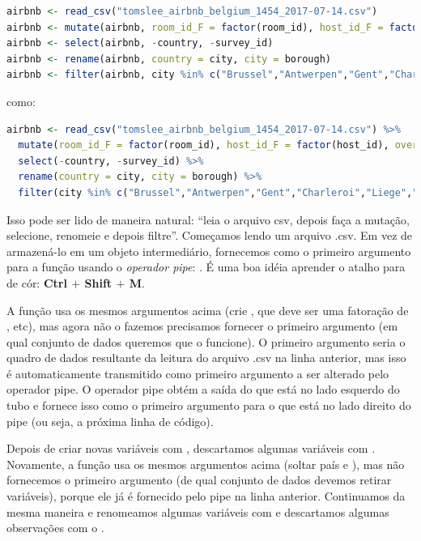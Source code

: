 \documentclass{article}
\begin{document}
\begin{lstlisting}[language=R]
airbnb <- read_csv("tomslee_airbnb_belgium_1454_2017-07-14.csv")
airbnb <- mutate(airbnb, room_id_F = factor(room_id), host_id_F = factor(host_id), overall_satisfaction_100 = overall_satisfaction * 20)
airbnb <- select(airbnb, -country, -survey_id)
airbnb <- rename(airbnb, country = city, city = borough)
airbnb <- filter(airbnb, city %in% c("Brussel","Antwerpen","Gent","Charleroi","Liege","Brugge","Namur","Leuven","Mons","Aalst")) 
\end{lstlisting}

como:
\begin{lstlisting}[language=R]
airbnb <- read_csv("tomslee_airbnb_belgium_1454_2017-07-14.csv") %>% 
  mutate(room_id_F = factor(room_id), host_id_F = factor(host_id), overall_satisfaction_100 = overall_satisfaction * 20) %>% 
  select(-country, -survey_id) %>% 
  rename(country = city, city = borough) %>% 
  filter(city %in% c("Brussel","Antwerpen","Gent","Charleroi","Liege","Brugge","Namur","Leuven","Mons","Aalst")) 
\end{lstlisting}

Isso pode ser lido de maneira natural: “leia o arquivo csv, depois faça a mutação, selecione, renomeie e depois filtre”. Começamos lendo um arquivo .csv. Em vez de armazená-lo em um objeto intermediário, fornecemos como o primeiro argumento para a função  usando o \textit{operador pipe}: \fbox{\%$>$\%}. É uma boa idéia aprender o atalho para \fbox{\%$>$\%} de cór: \textbf{Ctrl $+$ Shift $+$ M}. 

A função  usa os mesmos argumentos acima (crie , que deve ser uma fatoração de , etc), mas agora não o fazemos precisamos fornecer o primeiro argumento (em qual conjunto de dados queremos que o  funcione). O primeiro argumento seria o quadro de dados resultante da leitura do arquivo .csv na linha anterior, mas isso é automaticamente transmitido como primeiro argumento a ser alterado pelo operador pipe. O operador pipe obtém a saída do que está no lado esquerdo do tubo e fornece isso como o primeiro argumento para o que está no lado direito do pipe (ou seja, a próxima linha de código).

Depois de criar novas variáveis com , descartamos algumas variáveis com . Novamente, a função  usa os mesmos argumentos acima (soltar país e ), mas não fornecemos o primeiro argumento (de qual conjunto de dados devemos retirar variáveis), porque ele já é fornecido pelo pipe na linha anterior. Continuamos da mesma maneira e renomeamos algumas variáveis com  e descartamos algumas observações com o .
\end{document}

